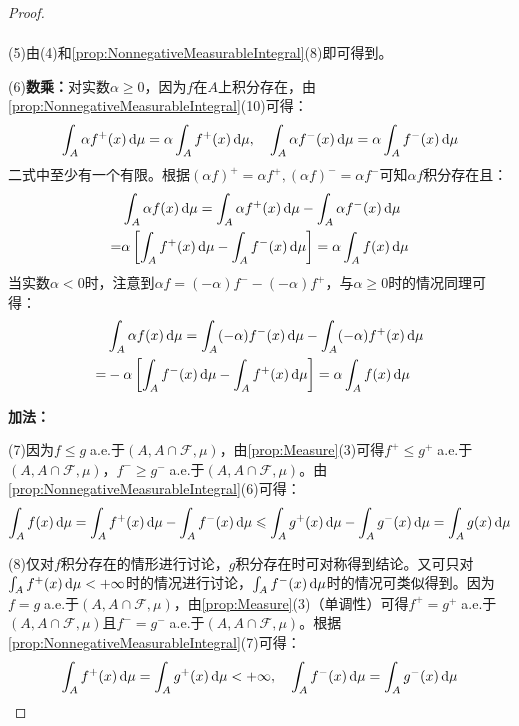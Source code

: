 \begin{proof}
\begin{gather*}
	\end{gather*}\par
	(5)由(4)和\cref{prop:NonnegativeMeasurableIntegral}(8)即可得到。\par
	(6)\textbf{数乘：}对实数$\alpha\geqslant0$，因为$f$在$A$上积分存在，由\cref{prop:NonnegativeMeasurableIntegral}(10)可得：
	\begin{equation*}
		\int_{A}\alpha f^+(x)\mathop{}\!\mathrm{d}\mu=\alpha\int_{A}f^+(x)\mathop{}\!\mathrm{d}\mu,\quad\int_{A}\alpha f^-(x)\mathop{}\!\mathrm{d}\mu=\alpha\int_{A}f^-(x)\mathop{}\!\mathrm{d}\mu
	\end{equation*}
	二式中至少有一个有限。根据$(\alpha f)^+=\alpha f^+,(\alpha f)^-=\alpha f^-$可知$\alpha f$积分存在且：
	\begin{align*}
		&\int_{A}\alpha f(x)\mathop{}\!\mathrm{d}\mu=\int_{A}\alpha f^+(x)\mathop{}\!\mathrm{d}\mu-\int_{A}\alpha f^-(x)\mathop{}\!\mathrm{d}\mu \\
		=&\alpha\left[\int_{A}f^+(x)\mathop{}\!\mathrm{d}\mu-\int_{A}f^-(x)\mathop{}\!\mathrm{d}\mu\right]=\alpha\int_{A}f(x)\mathop{}\!\mathrm{d}\mu
	\end{align*}
	当实数$\alpha<0$时，注意到$\alpha f=(-\alpha)f^--(-\alpha)f^+$，与$\alpha\geqslant0$时的情况同理可得：
	\begin{align*}
		&\int_{A}\alpha f(x)\mathop{}\!\mathrm{d}\mu=\int_{A}(-\alpha)f^-(x)\mathop{}\!\mathrm{d}\mu-\int_{A}(-\alpha)f^+(x)\mathop{}\!\mathrm{d}\mu \\
		=&-\alpha\left[\int_{A}f^-(x)\mathop{}\!\mathrm{d}\mu-\int_{A}f^+(x)\mathop{}\!\mathrm{d}\mu\right]=\alpha\int_{A}f(x)\mathop{}\!\mathrm{d}\mu
	\end{align*}\par
	\textbf{加法：}\par
	(7)因为$f\leqslant g\;$a.e.于$(A,A\cap\mathscr{F},\mu)$，由\cref{prop:Measure}(3)可得$f^+\leqslant g^+\;$a.e.于$(A,A\cap\mathscr{F},\mu)$，$f^-\geqslant g^-\;$a.e.于$(A,A\cap\mathscr{F},\mu)$。由\cref{prop:NonnegativeMeasurableIntegral}(6)可得：
	\begin{equation*}
		\int_{A}f(x)\mathop{}\!\mathrm{d}\mu=\int_{A}f^+(x)\mathop{}\!\mathrm{d}\mu-\int_{A}f^-(x)\mathop{}\!\mathrm{d}\mu\leqslant\int_{A}g^+(x)\mathop{}\!\mathrm{d}\mu-\int_{A}g^-(x)\mathop{}\!\mathrm{d}\mu=\int_{A}g(x)\mathop{}\!\mathrm{d}\mu
	\end{equation*}\par
	(8)仅对$f$积分存在的情形进行讨论，$g$积分存在时可对称得到结论。又可只对$\int_{A}f^+(x)\mathop{}\!\mathrm{d}\mu<+\infty$时的情况进行讨论，$\int_{A}f^-(x)\mathop{}\!\mathrm{d}\mu$时的情况可类似得到。因为$f=g\;$a.e.于$(A,A\cap\mathscr{F},\mu)$，由\cref{prop:Measure}(3)（单调性）可得$f^+=g^+\;$a.e.于$(A,A\cap\mathscr{F},\mu)$且$f^-=g^-\;$a.e.于$(A,A\cap\mathscr{F},\mu)$。根据\cref{prop:NonnegativeMeasurableIntegral}(7)可得：
	\begin{equation*}
		\int_{A}f^+(x)\dif\mu=\int_{A}g^+(x)\dif\mu<+\infty,\quad\int_{A}f^-(x)\dif\mu=\int_{A}g^-(x)\dif\mu

\end{equation*}
\end{proof}

